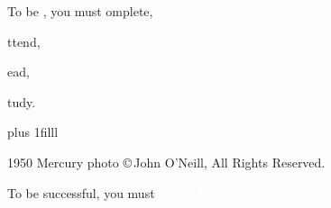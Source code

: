 \documentclass[t]{beamer}
\begin{document}

{
\begin{frame}[b]
\end{frame}
}


%
%
%

{

\begin{frame}[t]{To be , you must}
\vspace{1ex}
\hspace{22em}omplete,

\vspace{1ex}
\hspace{22em}ttend,

\vspace{1ex}
\hspace{22em}ead,

\vspace{1ex}
\hspace{22em}tudy.

\vskip 0pt plus 1filll

\tiny 1950 Mercury photo \copyright\,John O'Neill, All Rights Reserved.
\end{frame}
}
%
{
\begin{frame}[b,plain]{To be successful, you must }
\textcolor{white}{\tiny Daniel Foster, Flickr, }
\end{frame}
}
\end{document}
